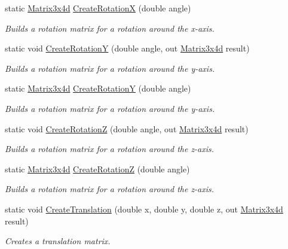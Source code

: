 \begin{DoxyCompactItemize}
static \hyperlink{struct_open_t_k_1_1_matrix3x4d}{Matrix3x4d} \hyperlink{struct_open_t_k_1_1_matrix3x4d_a4f634c6d089c3c596bf898a570867c81}{Create\-Rotation\-X} (double angle)
\begin{DoxyCompactList}\small\item\em Builds a rotation matrix for a rotation around the x-\/axis. \end{DoxyCompactList}\item 
static void \hyperlink{struct_open_t_k_1_1_matrix3x4d_ace360fd21a090c6e9f52563c9d43433f}{Create\-Rotation\-Y} (double angle, out \hyperlink{struct_open_t_k_1_1_matrix3x4d}{Matrix3x4d} result)
\begin{DoxyCompactList}\small\item\em Builds a rotation matrix for a rotation around the y-\/axis. \end{DoxyCompactList}\item 
static \hyperlink{struct_open_t_k_1_1_matrix3x4d}{Matrix3x4d} \hyperlink{struct_open_t_k_1_1_matrix3x4d_a0641128029c47e68a427060cd807c4fa}{Create\-Rotation\-Y} (double angle)
\begin{DoxyCompactList}\small\item\em Builds a rotation matrix for a rotation around the y-\/axis. \end{DoxyCompactList}\item 
static void \hyperlink{struct_open_t_k_1_1_matrix3x4d_a4d82955101caea3834f30136a40f2fdf}{Create\-Rotation\-Z} (double angle, out \hyperlink{struct_open_t_k_1_1_matrix3x4d}{Matrix3x4d} result)
\begin{DoxyCompactList}\small\item\em Builds a rotation matrix for a rotation around the z-\/axis. \end{DoxyCompactList}\item 
static \hyperlink{struct_open_t_k_1_1_matrix3x4d}{Matrix3x4d} \hyperlink{struct_open_t_k_1_1_matrix3x4d_a618bd430df993e354917badf18467d90}{Create\-Rotation\-Z} (double angle)
\begin{DoxyCompactList}\small\item\em Builds a rotation matrix for a rotation around the z-\/axis. \end{DoxyCompactList}\item 
static void \hyperlink{struct_open_t_k_1_1_matrix3x4d_a79cf2ef690c6103758c3b865bae584a5}{Create\-Translation} (double x, double y, double z, out \hyperlink{struct_open_t_k_1_1_matrix3x4d}{Matrix3x4d} result)
\begin{DoxyCompactList}\small\item\em Creates a translation matrix. \end{DoxyCompactList}\item 

\end{DoxyCompactItemize}
